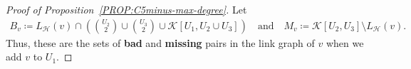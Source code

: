 \documentclass[11pt,a4paper]{article}
\theoremstyle{remark}
\newcommand{\C}[1]{\mathcal{#1}}
\begin{document}
\begin{proof}[Proof of Proposition~\ref{PROP:C5minus-max-degree}]
     Let 
    \begin{align*}
        B_{v}
         \coloneqq L_{\mathcal{H}}(v) \cap \left( \binom{U_2}{2} \cup \binom{U_3}{2} \cup \mathcal{K}[U_1, U_2\cup U_3]\right) 
        \quad\text{and}\quad 
        M_{v}
         \coloneqq \mathcal{K}[U_2, U_3] \setminus L_{\mathcal{H}}(v). 
    \end{align*}
    Thus, these are the sets of \textbf{bad} and \textbf{missing} pairs in the link graph of $v$ when we add $v$ to $U_1$.
    

\end{proof}
\end{document}
